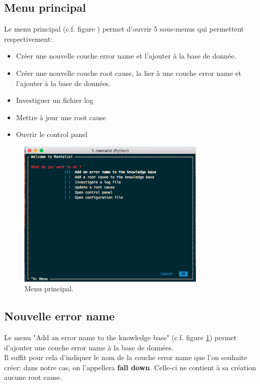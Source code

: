 \subsection{Menu principal}
\label{Industrialisation du produit: Utilisation suggérée des outils: Menu principal}
Le menu principal (c.f. figure ) permet d'ouvrir 5 sous-menus qui permettent respectivement:
\begin{itemize}
	\item Créer une nouvelle couche error name et l'ajouter à la base de donnée.
	\item Créer une nouvelle couche root cause, la lier à une couche error name et l'ajouter à la base de données.
	\item Investiguer un fichier log
	\item Mettre à jour une root cause
	\item Ouvrir le control panel
\end{itemize}

\begin{figure}[H]
	\centering\includegraphics[height=7cm]{images/main_menu.png}
	\caption[Menu principal]{Menu principal.}
	\label{fig:Menu principal}
\end{figure} 

\subsection{Nouvelle error name}
\label{Industrialisation du produit: Utilisation suggérée des outils: Nouvelle error name}
Le menu "Add an error name to the knowledge base" (c.f. figure 	\ref{fig:Menu principal}) permet d'ajouter une couche error name à la base de données. \\
Il suffit pour cela d'indiquer le nom de la couche error name que l'on souhaite créer: dans notre cas, on l'appellera \textbf{fall down}. Celle-ci ne contient à sa création aucune root cause.

